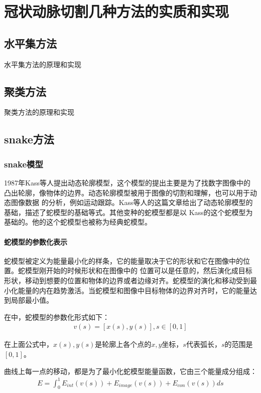 \chapter{冠状动脉切割几种方法的实质和实现}
\section{水平集方法}
水平集方法的原理和实现
\section{聚类方法}
聚类方法的原理和实现
\section{snake方法}
\subsection{snake模型}
1987年Kass等人提出动态轮廓模型\cite{kass1988snakes}，这个模型的提出主要是为了找数字图像中的
凸出轮廓，像物体的边界。动态轮廓模型被用于图像的切割和理解，也可以用于动态图像数据
的分析，例如运动跟踪。Kass等人\cite{kass1988snakes}的这篇文章给出了动态轮廓模型的基础，描述了蛇模型的基础等式。其他变种的蛇模型都是以
Kass的这个蛇模型为基础的。他的这个蛇模型也被称为经典蛇模型。
\subsubsection{蛇模型的参数化表示}
蛇模型被定义为能量最小化的样条，它的能量取决于它的形状和它在图像中的位置。蛇模型刚开始的时候形状和在图像中的
位置可以是任意的，然后演化成目标形状，移动到想要的位置和物体的边界或者边缘对齐。蛇模型的演化和移动受到最小化能量的内在趋势激活。当蛇模型和图像中目标物体的边界对齐时，它的能量达到局部最小值。

在\cite{kass1988snakes}中，蛇模型的参数化形式如下：
\begin{align}\label{eq:base_snake_parameter_representation}
	v(s) = [x(s),y(s)],s \in [0,1]
\end{align}

在上面公式中，$x(s),y(s)$是轮廓上各个点的$x,y$坐标，$s$代表弧长，$s$的范围是$[0,1]$。

曲线上每一点的移动，都是为了最小化蛇模型能量函数，它由三个能量成分组成：
\begin{align}\label{eq:base_snake_calculative_representation}
	E = \int_0^1E_{int}(v(s))+E_{image}(v(s))+E_{con}(v(s)) ds
\end{align}

